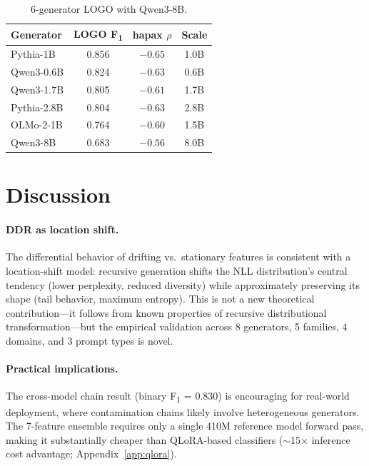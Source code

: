 \documentclass[11pt,a4paper]{article}
\newcommand{\fone}{F\textsubscript{1}}
\newcommand{\rhosp}{\rho}
\begin{document}
\begin{table}[t]
\centering
\caption{6-generator LOGO with Qwen3-8B.}
\label{tab:largescale}
\begin{tabular}{lccc}
\toprule
\textbf{Generator} & \textbf{LOGO \fone{}} & \textbf{hapax $\rhosp$} & \textbf{Scale} \\
\midrule
Pythia-1B & 0.856 & $-0.65$ & 1.0B \\
Qwen3-0.6B & 0.824 & $-0.63$ & 0.6B \\
Qwen3-1.7B & 0.805 & $-0.61$ & 1.7B \\
Pythia-2.8B & 0.804 & $-0.63$ & 2.8B \\
OLMo-2-1B & 0.764 & $-0.60$ & 1.5B \\
Qwen3-8B & 0.683 & $-0.56$ & 8.0B \\
\bottomrule
\end{tabular}
\end{table}

\section{Discussion}
\label{sec:discussion}

\paragraph{DDR as location shift.}
The differential behavior of drifting vs.\ stationary features is consistent with a location-shift model:
recursive generation shifts the NLL distribution's central tendency (lower perplexity, reduced diversity)
while approximately preserving its shape (tail behavior, maximum entropy).
This is not a new theoretical contribution---it follows from known properties of recursive distributional transformation---but
the empirical validation across 8 generators, 5 families, 4 domains, and 3 prompt types is novel.

\paragraph{Practical implications.}
The cross-model chain result (binary \fone{} = 0.830) is encouraging for real-world deployment,
where contamination chains likely involve heterogeneous generators.
The 7-feature ensemble requires only a single 410M reference model forward pass,
making it substantially cheaper than QLoRA-based classifiers ($\sim$15$\times$ inference cost advantage; Appendix~\ref{app:qlora}).
\end{document}
